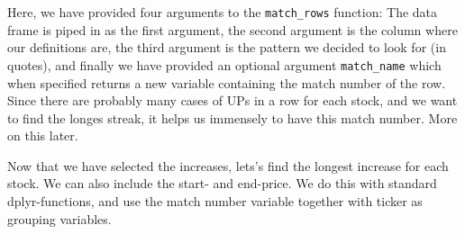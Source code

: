\documentclass[]{article}
\newenvironment{Shaded}{\begin{snugshade}}{\end{snugshade}}
\newcommand{\CommentTok}[1]{\textcolor[rgb]{0.56,0.35,0.01}{\textit{#1}}}
\newcommand{\DataTypeTok}[1]{\textcolor[rgb]{0.13,0.29,0.53}{#1}}
\newcommand{\KeywordTok}[1]{\textcolor[rgb]{0.13,0.29,0.53}{\textbf{#1}}}
\newcommand{\NormalTok}[1]{#1}
\newcommand{\OperatorTok}[1]{\textcolor[rgb]{0.81,0.36,0.00}{\textbf{#1}}}
\newcommand{\StringTok}[1]{\textcolor[rgb]{0.31,0.60,0.02}{#1}}
\begin{document}
\begin{Shaded}
\end{Shaded}

Here, we have provided four arguments to the \texttt{match\_rows}
function: The data frame is piped in as the first argument, the second
argument is the column where our definitions are, the third argument is
the pattern we decided to look for (in quotes), and finally we have
provided an optional argument \texttt{match\_name} which when specified
returns a new variable containing the match number of the row. Since
there are probably many cases of UPs in a row for each stock, and we
want to find the longes streak, it helps us immensely to have this match
number. More on this later.

Now that we have selected the increases, lets's find the longest
increase for each stock. We can also include the start- and end-price.
We do this with standard dplyr-functions, and use the match number
variable together with ticker as grouping variables.
\end{document}
